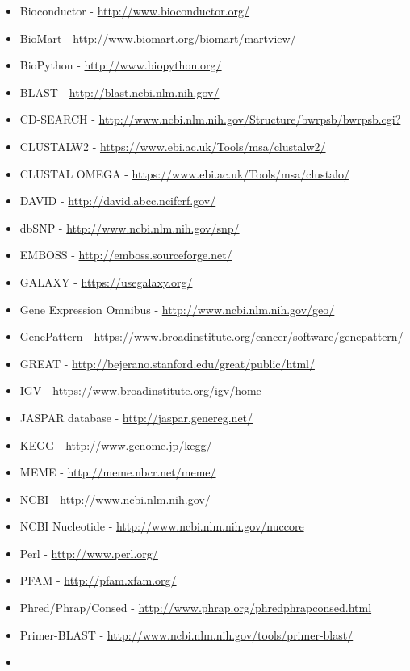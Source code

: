 \documentclass[]{article}
\begin{document}
\begin{itemize}
\itemsep1pt\parskip0pt
\item
  Bioconductor - \url{http://www.bioconductor.org/}
\item
  BioMart - \url{http://www.biomart.org/biomart/martview/}
\item
  BioPython - \url{http://www.biopython.org/}
\item
  BLAST - \url{http://blast.ncbi.nlm.nih.gov/}
\item
  CD-SEARCH -
  \href{http://www.ncbi.nlm.nih.gov/Structure/bwrpsb/bwrpsb.cg\%20i?}{http://www.ncbi.nlm.nih.gov/Structure/bwrpsb/bwrpsb.cgi?}
\item
  CLUSTALW2 - \url{https://www.ebi.ac.uk/Tools/msa/clustalw2/}
\item
  CLUSTAL OMEGA - \url{https://www.ebi.ac.uk/Tools/msa/clustalo/}
\item
  DAVID - \url{http://david.abcc.ncifcrf.gov/}
\item
  dbSNP - \url{http://www.ncbi.nlm.nih.gov/snp/}
\item
  EMBOSS - \url{http://emboss.sourceforge.net/}
\item
  GALAXY - \url{https://usegalaxy.org/}
\item
  Gene Expression Omnibus - \url{http://www.ncbi.nlm.nih.gov/geo/}
\item
  GenePattern -
  \url{https://www.broadinstitute.org/cancer/software/genepattern/}
\item
  GREAT - \url{http://bejerano.stanford.edu/great/public/html/}
\item
  IGV - \url{https://www.broadinstitute.org/igv/home}
\item
  JASPAR database - \url{http://jaspar.genereg.net/}
\item
  KEGG - \url{http://www.genome.jp/kegg/}
\item
  MEME - \url{http://meme.nbcr.net/meme/}
\item
  NCBI - \url{http://www.ncbi.nlm.nih.gov/}
\item
  NCBI Nucleotide - \url{http://www.ncbi.nlm.nih.gov/nuccore}
\item
  Perl - \url{http://www.perl.org/}
\item
  PFAM - \url{http://pfam.xfam.org/}
\item
  Phred/Phrap/Consed - \url{http://www.phrap.org/phredphrapconsed.html}
\item
  Primer-BLAST - \url{http://www.ncbi.nlm.nih.gov/tools/primer-blast/}
\item

\end{itemize}
\end{document}
